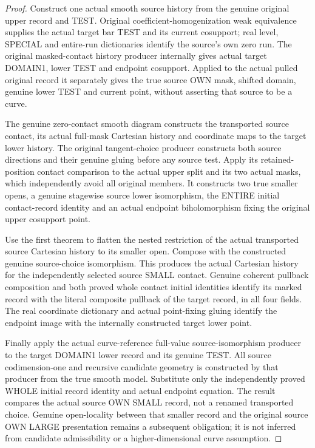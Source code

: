 \begin{proof}
Construct one actual smooth source history from the genuine original
upper record and TEST. Original coefficient-homogenization weak
equivalence supplies the actual target bar TEST and its current
cosupport; real level, SPECIAL and entire-run dictionaries identify
the source's own zero run. The original masked-contact history producer
internally gives actual target DOMAIN1, lower TEST and endpoint
cosupport. Applied to the actual pulled original record it separately
gives the true source OWN mask, shifted domain, genuine lower TEST and
current point, without asserting that source to be a curve.

The genuine zero-contact smooth diagram constructs the transported
source contact, its actual full-mask Cartesian history and coordinate
maps to the target lower history. The original tangent-choice producer
constructs both source directions and their genuine gluing before
any source test. Apply its retained-position contact comparison to the
actual upper split and its two actual masks, which independently avoid
all original members. It constructs two true smaller opens, a genuine
stagewise source lower isomorphism, the ENTIRE initial contact-record
identity and an actual endpoint biholomorphism fixing the original
upper cosupport point.

Use the first theorem to flatten the nested restriction of the actual
transported source Cartesian history to its smaller open. Compose
with the constructed genuine source-choice isomorphism. This produces
the actual Cartesian history for the independently selected source
SMALL contact. Genuine coherent pullback composition and both proved
whole contact initial identities identify its marked record with the
literal composite pullback of the target record, in all four fields.
The real coordinate dictionary and actual point-fixing gluing identify
the endpoint image with the internally constructed target lower point.

Finally apply the actual curve-reference full-value source-isomorphism
producer to the target DOMAIN1 lower record and its genuine TEST.
All source codimension-one and recursive candidate geometry is
constructed by that producer from the true smooth model. Substitute
only the independently proved WHOLE initial record identity and
actual endpoint equation. The result compares the actual source OWN
SMALL record, not a renamed transported choice. Genuine open-locality
between that smaller record and the original source OWN LARGE
presentation remains a subsequent obligation; it is not inferred from
candidate admissibility or a higher-dimensional curve assumption.
\end{proof}
